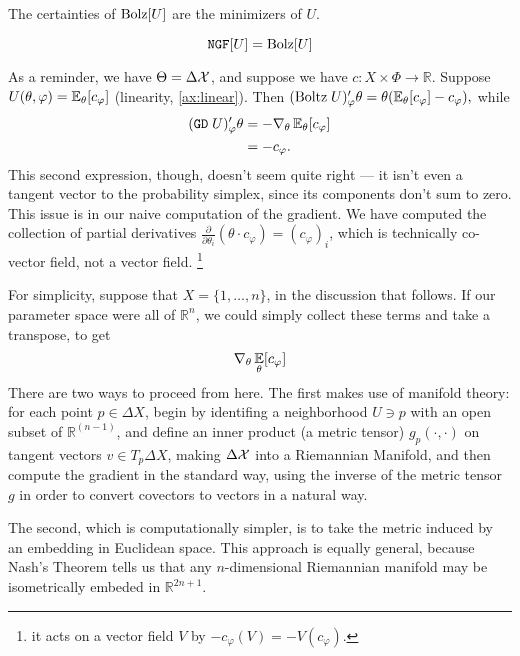 \documentclass{article}
\begin{document}
The certainties of $\mathrm{Bolz}[U]$ are the minimizers of $U$. 


\begin{prop}
    \[
        \mathtt{NGF}[U] = \mathrm{Bolz}[U]
    \]
\end{prop}

\begin{wip}
    As a reminder, we have $\Theta = \Delta \mathcal X$, and suppose we have $c : X \times \Phi \to \mathbb R$. 
    Suppose $U(\theta, \varphi) = \operatorname*{\mathbb{E}}_\theta[ c_\varphi ]$ (linearity, \cref{ax:linear}).
    Then     
    $%
        (\mathrm{Boltz}\;U)'_\varphi \theta = \theta(\Ex_\theta[c_\varphi] - c_\varphi),
    $%
    while
    \begin{align*}
         (\mathtt{GD}\; U)'_\varphi \theta &= 
             - \nabla_{\theta} \operatorname*{\mathbb{E}}\nolimits_\theta [ c_\varphi ]
             \\ &= - c_\varphi
             .
    \end{align*}
    This second expression, though, doesn't seem quite right --- it isn't even a tangent vector to the probability simplex, since its components don't sum to zero.  
    This issue is in our naive computation of the gradient. 
    We have computed the collection of partial derivatives $\frac{\partial}{\partial \theta_i} ( \theta \cdot  c_\varphi) = (c_\varphi)_i$,
    which is technically  co-vector field, not a vector field.%
        \footnote{it acts on a vector field $V$ by $ -c_\varphi ( V ) = - V(c_\varphi)$.}
    
    For simplicity, suppose that $X = \{1, \ldots, n\}$, in the discussion that follows. 
    If our parameter space were all of $\mathbb R^n$, we could simply collect these terms and take a transpose, to get 
    \[
        \nabla_\theta \operatorname*{\mathbb{E}}_{\theta}[c_\varphi]
    \]
    There are two ways to proceed from here. 
    The first makes use of manifold theory: for each point $p \in \Delta X$, begin by identifing a neighborhood $U \ni p$ with an open subset of $\mathbb R^{(n-1)}$, and define an inner product (a metric tensor) $g_p(\cdot, \cdot)$ on tangent vectors $v \in T_p\Delta X$, making $\Delta\mathcal X$ into a Riemannian Manifold, and then compute the gradient in the standard way, using the inverse of the metric tensor $g$ in order to convert covectors to vectors in a natural way.
    
    The second, which is computationally simpler, is to take the metric induced by an embedding in Euclidean space. 
    This approach is equally general, because Nash's Theorem \parencite{nash1956imbedding} tells us that any $n$-dimensional Riemannian manifold may be isometrically embeded in $\mathbb R^{2n+1}$.
    
    
    
\end{wip}
\end{document}
